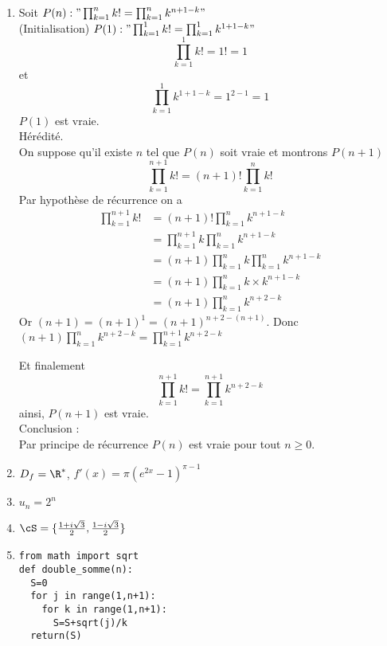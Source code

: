 \documentclass[a4paper, 11pt,reqno]{article}
\begin{document}
\begin{correction}
\begin{enumerate}
\item Soit $P(n )  : "\prod_{k=1}^n k! = \prod_{k=1}^n k^{n+1-k}"$\\

(Initialisation) $P(1) :"\prod_{k=1}^1 k! = \prod_{k=1}^1 k^{1+1-k}" $
$$\prod_{k=1}^1 k! = 1! =1$$
et 
$$\prod_{k=1}^1 k^{1+1-k} = 1^{2-1} =1$$
$P(1)$ est vraie. \\

Hérédité. \\
On suppose qu'il existe $n$ tel que $P(n) $ soit vraie et montrons $P(n+1)$
$$\prod_{k=1}^{n+1} k! = (n+1)!\prod_{k=1}^n k! $$
Par hypothèse de récurrence on a 
\begin{align*}
\prod_{k=1}^{n+1} k! &=  (n+1)! \prod_{k=1}^n k^{n+1-k}\\
								&=  \prod_{k=1}^{n+1} k \prod_{k=1}^n k^{n+1-k}\\
								&=  (n+1) \prod_{k=1}^{n} k \prod_{k=1}^n k^{n+1-k}\\
								&=  (n+1) \prod_{k=1}^{n} k\times k^{n+1-k}\\
								&=  (n+1) \prod_{k=1}^{n} k^{n+2-k}
\end{align*}
Or $(n+1)  =(n+1) ^{1} = (n+1)^{n+2-(n+1)} $. Donc 
$ (n+1) \prod_{k=1}^{n} k^{n+2-k} =\prod_{k=1}^{n+1} k^{n+2-k}$

Et finalement $$\prod_{k=1}^{n+1} k!  = \prod_{k=1}^{n+1} k^{n+2-k}$$
ainsi, $P(n+1) $ est vraie. \\

Conclusion : \\
Par principe de récurrence $P(n) $ est vraie pour tout $n\geq 0$. 


\item $D_f=\R^*$, $f'(x) = \pi (e^{2x}-1)^{\pi-1}$
\item $u_n=2^n$
\item $\cS= \{ \frac{1+i\sqrt{3}}{2}, \frac{1-i\sqrt{3}}{2}\}$
\item 
\begin{lstlisting}
from math import sqrt
def double_somme(n):
  S=0
  for j in range(1,n+1):
    for k in range(1,n+1):
      S=S+sqrt(j)/k
  return(S)
\end{lstlisting}

\end{enumerate}
\end{correction} 
\end{document}
